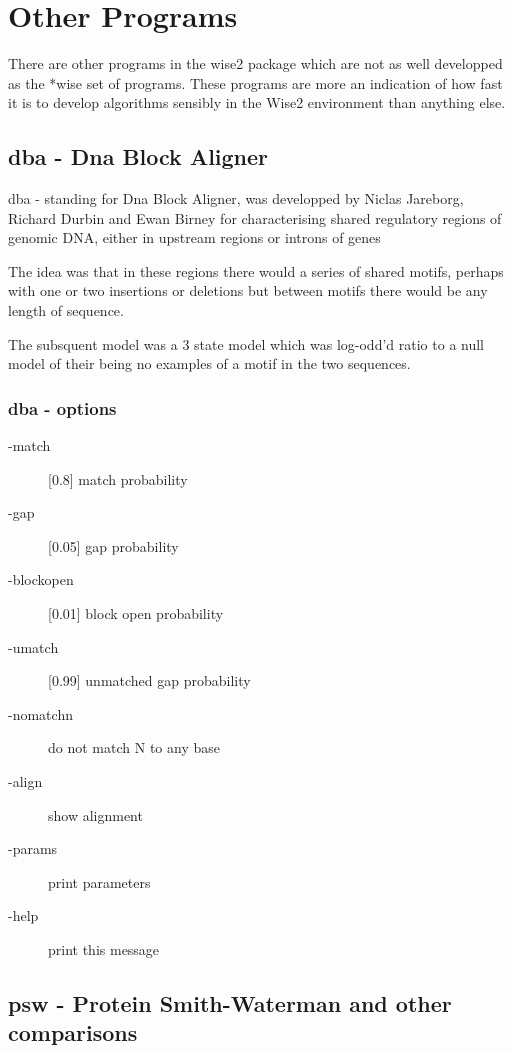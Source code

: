 \documentclass{article}
\begin{document}
\newpage
\section{Other Programs}

There are other programs in the wise2 package which are not as well
developped as the *wise set of programs. These programs are more
an indication of how fast it is to develop algorithms sensibly
in the Wise2 environment than anything else. 

\subsection{dba - Dna Block Aligner}
\label{sec:dba}

dba - standing for Dna Block Aligner, was developped by Niclas Jareborg,
Richard Durbin and Ewan Birney for characterising shared regulatory regions
of genomic DNA, either in upstream regions or introns of genes

The idea was that in these regions there would a series of shared motifs,
perhaps with one or two insertions or deletions but between motifs there
would be any length of sequence. 

The subsquent model was a 3 state model which was log-odd'd ratio to a null
model of their being no examples of a motif in the two sequences.

\subsubsection{dba - options}
\begin{description}
\item[-match] [0.8]      match probability
\item[-gap] [0.05]       gap probability
\item[-blockopen] [0.01] block open probability
\item[-umatch] [0.99]    unmatched gap probability
\item[-nomatchn]         do not match N to any base
\item[-align]            show alignment
\item[-params]           print parameters
\item[-help]            print this message
\end{description}

\subsection{psw - Protein Smith-Waterman and other comparisons}
\label{sec:psw}
\end{document}
